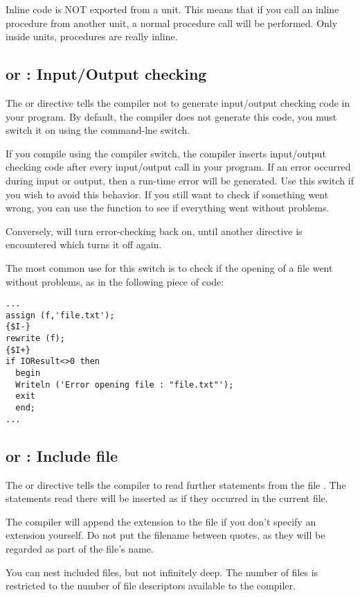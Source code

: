 \documentclass{report}
\begin{document}
Inline code is NOT exported from a unit. This means that if you call an
inline procedure from another unit, a normal procedure call will be
performed. Only inside units,  procedures are really inline.

\subsection{ or  : Input/Output checking}
The  or  directive tells the compiler
not to generate input/output checking code in your program. By default, the
compiler does not generate this code, you must switch it on using the
 command-lne switch.

If you compile using the  compiler switch, the \fpc compiler inserts input/output
checking code after every input/output call in your program. If an error
occurred during input or output, then a run-time error will be generated.
Use this switch if you wish to avoid this behavior.
If you still want to check if something went wrong, you can use the
 function to see if everything went without problems.

Conversely,  will turn error-checking back on, until another
directive is encountered which turns it off again.

The most common use for this switch is to check if the opening of a file
went without problems, as in the following piece of code:
\begin{verbatim}
...
assign (f,'file.txt');
{$I-}
rewrite (f);
{$I+}
if IOResult<>0 then
  begin
  Writeln ('Error opening file : "file.txt"');
  exit
  end;
...
\end{verbatim}

\subsection{ or  : Include file }
The  or  directive
tells the compiler to read further statements from the file .
The statements read there will be inserted as if they occurred in the
current file.

The compiler will append the  extension to the file if you don't
specify an extension yourself. Do not put the filename between quotes, as
they will be regarded as part of the file's name.

You can nest included files, but not infinitely deep. The number of files is
restricted to the number of file descriptors available to the \fpc compiler.
\end{document}

